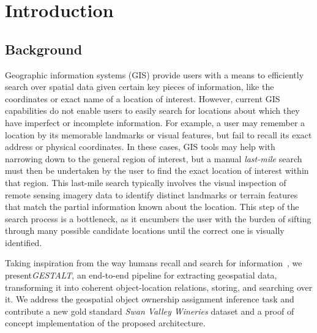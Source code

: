 \section{Introduction}
\label{section:introduction}

\subsection{Background}
Geographic information systems (GIS) provide users with a means to efficiently search over spatial data given certain key pieces of information, like the coordinates or exact name of a location of interest. However, current GIS capabilities do not enable users to easily search for locations about which they have imperfect or incomplete information. For example, a user may remember a location by its memorable landmarks or visual features, but fail to recall its exact address or physical coordinates. In these cases, GIS tools may help with narrowing down to the general region of interest, but a manual \emph{last-mile} search must then be undertaken by the user to find the exact location of interest within that region. This last-mile search typically involves the visual inspection of remote sensing imagery data to identify distinct landmarks or terrain features that match the partial information known about the location. This step of the search process is a bottleneck, as it encumbers the user with the burden of sifting through many possible candidate locations until the correct one is visually identified. 

Taking inspiration from the way humans recall and search for information~\cite{}, we present\emph{GESTALT}, an end-to-end pipeline for extracting geospatial data, transforming it into coherent object-location relations, storing, and searching over it. We address the geospatial object ownership assignment inference task and contribute a new gold standard \textit{Swan Valley Wineries} dataset and a proof of concept implementation of the proposed architecture.  %



